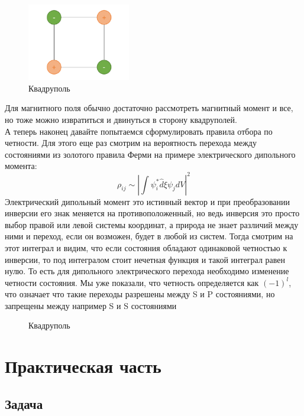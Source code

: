 \documentclass[12pt]{article}
\begin{document}
\begin{figure}[h]
    \centering
    \includegraphics[width=0.4\textwidth,height=\textheight,keepaspectratio]{Seminar_08/pics/pic_02.pdf}
    \caption{Квадруполь}
    \label{fig:sem_08_quad}
\end{figure}
Для магнитного поля обычно достаточно рассмотреть магнитный момент и все, но тоже можно извратиться и двинуться в сторону квадруполей.\\
А теперь наконец давайте попытаемся сформулировать правила отбора по четности. Для этого еще раз смотрим на вероятность перехода между состояниями из золотого правила Ферми на примере электрического дипольного момента:
\begin{equation*}
    \rho_{ij} \sim \left| \int \psi^*_i\hat{d}\xi\psi_j dV\right|^2
\end{equation*}
Электрический дипольный момент это истинный вектор и при преобразовании инверсии его знак меняется на противоположенный, но ведь инверсия это просто выбор правой или левой системы координат, а природа не знает различий между ними и переход, если он возможен, будет в любой из систем. Тогда смотрим на этот интеграл и видим, что если состояния обладают одинаковой четностью к инверсии, то под интегралом стоит нечетная функция и такой интеграл равен нулю. То есть для дипольного электрического перехода необходимо изменение четности состояния. Мы уже показали, что четность определяется как $(-1)^l$, что означает что такие переходы разрешены между S и P состояниями, но запрещены между например S и S состояниями


\begin{figure}[h]
    \centering
    \caption{Квадруполь}
    \label{fig:sem_08_quad}
\end{figure}
\section{Практическая часть}
\subsection{Задача}
\label{task_}
\end{document}
